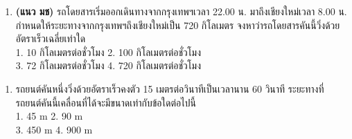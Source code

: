 \documentclass[a4paper,12pt,twoside]{article}
\begin{document}
\begin{enumerate}[resume]
	\item {} \textbf{(แนว มช)}  รถโดยสารเริ่มออกเดินทางจากกรุงเทพฯเวลา   22.00  น.   มาถึงเชียงใหม่เวลา 8.00 น. กำหนดให้ระยะทางจากกรุงเทพฯถึงเชียงใหม่เป็น   720  กิโลเมตร   จงหาว่ารถโดยสารคันนี้วิ่งด้วยอัตราเร็วเฉลี่ยเท่าใด \\
		1.  10  กิโลเมตรต่อชั่วโมง		\hfill					2.  100  กิโลเมตรต่อชั่วโมง \hfill\phantom{xx}\\
		3.  72  กิโลเมตรต่อชั่วโมง		\hfill					4.  720  กิโลเมตรต่อชั่วโมง \hfill\phantom{xx}
\vspace{0.8in}
\end{enumerate}

\begin{center}
\end{center}

\begin{enumerate}[resume]
\setlength{\leftmargin}{0pt}
\item รถยนต์คันหนึ่งวิ่งด้วยอัตราเร็วคงตัว   15  เมตรต่อวินาทีเป็นเวลานาน  60  วินาที  	ระยะทางที่รถยนต์คันนี้เคลื่อนที่ได้จะมีขนาดเท่ากับข้อใดต่อไปนี้ \\
		1.  45  m		\hfill			2.  90  m			\hfill\phantom{xx}\\		
		3.  450  m	\hfill				4.   900  m \hfill\phantom{xx}
\vspace{0.8in}
\end{enumerate}
\end{document}
